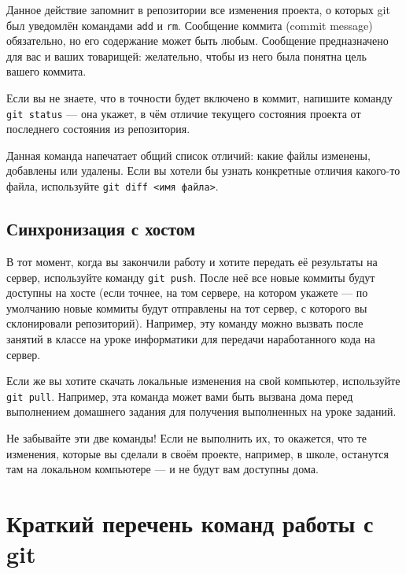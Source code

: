 \documentclass[12pt]{article}
\begin{document}
Данное действие запомнит в репозитории все изменения проекта, о которых
git был уведомлён командами \verb!add! и \verb!rm!.
Сообщение коммита (commit message) обязательно, но его содержание
может быть любым. Сообщение предназначено для вас и ваших товарищей:
желательно, чтобы из него была понятна цель вашего коммита.

Если вы не знаете, что в точности будет включено в коммит, 
напишите команду \verb!git status! --- она укажет, в чём отличие
текущего состояния проекта от последнего состояния из репозитория.

Данная команда напечатает общий список отличий: какие файлы изменены,
добавлены или удалены.
Если вы хотели бы узнать конкретные отличия какого-то файла, используйте
\verb!git diff <имя файла>!.

\subsection{Синхронизация с хостом}

В тот момент, когда вы закончили работу и хотите передать её результаты
на сервер, используйте команду \verb!git push!. После неё все новые
коммиты будут доступны на хосте (если точнее, на том сервере, на котором
укажете --- по умолчанию новые коммиты будут отправлены на тот сервер,
с которого вы склонировали репозиторий).
Например, эту команду можно вызвать после занятий в классе на уроке
информатики для передачи наработанного кода на сервер.

Если же вы хотите скачать локальные изменения на свой компьютер,
используйте \verb!git pull!. Например, эта команда может вами быть
вызвана дома перед выполнением домашнего задания для получения
выполненных на уроке заданий.

Не забывайте эти две команды! Если не выполнить их, то окажется, что
те изменения, которые вы сделали в своём проекте, например, в школе,
останутся там на локальном компьютере --- и не будут вам доступны дома.

\section{Краткий перечень команд работы с git}
\end{document}
